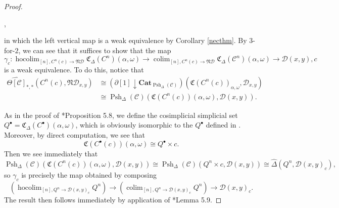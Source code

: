\documentclass[leqno]{article}
\numberwithin{equation}{subsection}
\theoremstyle{plain}   %
\theoremstyle{remark}
\theoremstyle{plain}
\DeclareMathOperator*{\coliml}{colim}
\newcommand{\Cat}{\ensuremath{\mathbf{Cat}}}
\newcommand{\overcat}[2]{{\left(#1\downarrow #2\right)}}
\DeclareMathOperator*{\hocoliml}{hocolim}
\newcommand{\psh}[1]{\ensuremath{\widehat{#1}}}
\newcommand{\C}{\ensuremath{\mathcal{C}}}
\newcommand{\cellset}{\ensuremath{\widehat{\Theta[\mathcal{C}]}}}
\newcommand{\spsh}{\ensuremath{\operatorname{Psh}_\Delta(\mathcal{C})}}
\begin{document}
\begin{proof}
	\begin{center}
		,
	\end{center}
	in which the left vertical map is a weak equivalence by Corollary \ref{necthm}. By \(3\)-for-\(2\), we can see that it suffices to show that the map
	\[\gamma_c: \hocoliml_{[n],C^n(c)\to \mathfrak{N}\mathcal{D}} \mathfrak{C}_\Delta(C^n)(\alpha,\omega) \to \coliml_{[n],C^n(c)\to \mathfrak{N}\mathcal{D}} \mathfrak{C}_\Delta(\C^n)(\alpha,\omega)\to \mathcal{D}(x,y),c\]
	is a weak equivalence.
	To do this, notice that
	\begin{align*}
		\cellset_{\ast,\ast}(C^n(c), \mathfrak{N}\mathcal{D}_{x,y}) & \cong \overcat{\partial[1]}{\Cat_{\spsh}}(\mathfrak{C}(C^n(c))_{\alpha,\omega},\mathcal{D}_{x,y}) \\
		& \cong \spsh(\mathfrak{C}(C^n(c))(\alpha,\omega), \mathcal{D}(x,y)).
	\end{align*}

	As in the proof of \cite{ds2}*{Proposition 5.8}, we define the cosimplicial simplicial set \(Q^\bullet = \mathfrak{C}_\Delta (C^\bullet)(\alpha,\omega)\), which is obviously isomorphic to the \(Q^\bullet\) defined in \cite{ds2}. Moreover, by direct computation, we see that
	\[\mathfrak{C}(C^\bullet(c))(\alpha,\omega)\cong Q^\bullet \times c.\]
	Then we see immediately that
	\[\spsh(\mathfrak{C}(C^n(c))(\alpha,\omega), \mathcal{D}(x,y)) \cong \spsh(Q^n \times c, \mathcal{D}(x,y))\cong \psh{\Delta}(Q^n, \mathcal{D}(x,y)_c),\]
	so \(\gamma_c\) is precisely the map obtained by composing
	\[\left(\hocoliml_{[n],Q^n\to \mathcal{D}(x,y)_c} Q^n\right) \to \left(\coliml_{[n],Q^n\to \mathcal{D}(x,y)_c} Q^n\right) \to \mathcal{D}(x,y)_c.\]
	The result then follows immediately by application of \cite{ds2}*{Lemma 5.9}.
\end{proof}
\end{document}
